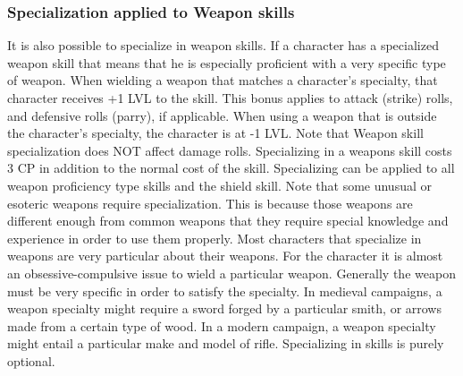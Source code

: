 \documentclass[twoside]{book}
\begin{document}
\subsubsection{Specialization applied to Weapon skills}
     It is also possible to specialize in weapon
                 skills. If a character has a specialized weapon skill
                 that means that he is especially proficient with a very
                 specific type of weapon. When wielding a weapon that
                 matches a character’s specialty, that character
                 receives +1 LVL to the skill. This bonus applies to
                 attack (strike) rolls, and defensive rolls (parry), if
                 applicable. When using a weapon that is outside the
                 character’s specialty, the character is at -1 LVL.
                 Note that Weapon skill specialization does NOT affect
                 damage rolls.  Specializing in a weapons skill costs 3 CP in
                 addition to the normal cost of the skill. Specializing
                 can be applied to all weapon proficiency type skills and
                 the shield skill. 
   Note that some unusual or esoteric weapons require
                 specialization. This is because those weapons are
                 different enough from common weapons that they require
                 special knowledge and experience in order to use them
                 properly.  Most characters that specialize in weapons are
                 very particular about their weapons. For the character
                 it is almost an obsessive-compulsive issue to wield a
                 particular weapon. Generally the weapon must be very
                 specific in order to satisfy the specialty. In medieval
                 campaigns, a weapon specialty might require a sword
                 forged by a particular smith, or arrows made from a
                 certain type of wood. In a modern campaign, a weapon
                 specialty might entail a particular make and model of
                 rifle.  Specializing in skills is purely optional. 
\end{document}
